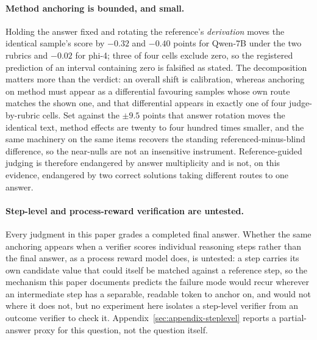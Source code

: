 \documentclass[11pt]{article}
\begin{document}
\paragraph{Method anchoring is bounded, and small.}
Holding the answer fixed and rotating the reference's \emph{derivation} moves the identical sample's score by $-0.32$ and $-0.40$ points for Qwen-7B under the two rubrics and $-0.02$ for phi-4; three of four cells exclude zero, so the registered prediction of an interval containing zero is falsified as stated.
The decomposition matters more than the verdict: an overall shift is calibration, whereas anchoring on method must appear as a differential favouring samples whose own route matches the shown one, and that differential appears in exactly one of four judge-by-rubric cells.
Set against the $\pm 9.5$ points that answer rotation moves the identical text, method effects are twenty to four hundred times smaller, and the same machinery on the same items recovers the standing referenced-minus-blind difference, so the near-nulls are not an insensitive instrument.
Reference-guided judging is therefore endangered by answer multiplicity and is not, on this evidence, endangered by two correct solutions taking different routes to one answer.

\paragraph{Step-level and process-reward verification are untested.}
Every judgment in this paper grades a completed final answer.
Whether the same anchoring appears when a verifier scores individual reasoning steps rather than the final answer, as a process reward model does, is untested: a step carries its own candidate value that could itself be matched against a reference step, so the mechanism this paper documents predicts the failure mode would recur wherever an intermediate step has a separable, readable token to anchor on, and would not where it does not, but no experiment here isolates a step-level verifier from an outcome verifier to check it. Appendix~\ref{sec:appendix-steplevel} reports a partial-answer proxy for this question, not the question itself.
\end{document}
